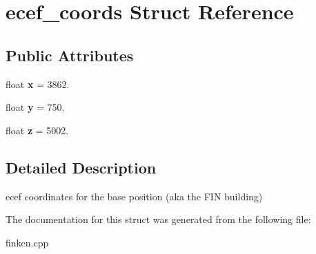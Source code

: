 \hypertarget{structecef__coords}{}\section{ecef\+\_\+coords Struct Reference}
\label{structecef__coords}
\subsection*{Public Attributes}
\begin{DoxyCompactItemize}
\item 
float {\bfseries x} = 3862.\hypertarget{structecef__coords_a8babce644114c7da9a19e637baa121d3}{}\label{structecef__coords_a8babce644114c7da9a19e637baa121d3}

\item 
float {\bfseries y} = 750.\hypertarget{structecef__coords_a1d7a58480890290b44784ebee21db0fa}{}\label{structecef__coords_a1d7a58480890290b44784ebee21db0fa}

\item 
float {\bfseries z} = 5002.\hypertarget{structecef__coords_a7c8f017506769d9e7ebe1115b62e56bb}{}\label{structecef__coords_a7c8f017506769d9e7ebe1115b62e56bb}

\end{DoxyCompactItemize}


\subsection{Detailed Description}
ecef coordinates for the base position (aka the F\+IN building) 

The documentation for this struct was generated from the following file\+:\begin{DoxyCompactItemize}
\item 
finken.\+cpp\end{DoxyCompactItemize}

